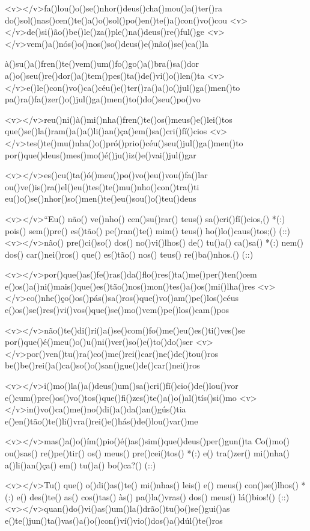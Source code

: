 <v></v>fa()lou()o()se()nhor()deus()cha()mou()a()ter()ra
do()sol()nas()cen()te()a()o()sol()po()en()te()a()con()vo()cou
<v></v>de()si()ão()be()le()za()ple()na()deus()re()ful()ge
<v></v>vem()a()nós()o()nos()so()deus()e()não()se()ca()la

à()su()a()fren()te()vem()um()fo()go()a()bra()sa()dor
a()o()seu()re()dor()a()tem()pes()ta()de()vi()o()len()ta
<v></v>e()le()con()vo()ca()céu()e()ter()ra()a()o()jul()ga()men()to
pa()ra()fa()zer()o()jul()ga()men()to()do()seu()po()vo

<v></v>reu()ni()à()mi()nha()fren()te()os()meus()e()lei()tos
que()se()la()ram()a()a()li()an()ça()em()sa()cri()fí()cios
<v></v>tes()te()mu()nha()o()pró()prio()céu()seu()jul()ga()men()to
por()que()deus()mes()mo()é()ju()iz()e()vai()jul()gar

<v></v>es()cu()ta()ó()meu()po()vo()eu()vou()fa()lar
ou()ve()is()ra()el()eu()tes()te()mu()nho()con()tra()ti
eu()o()se()nhor()so()men()te()eu()sou()o()teu()deus

<v></v>``Eu() não() ve()nho() cen()su()rar() teus() sa()cri()fí()cios,() *(:)
pois() sem()pre() es()tão() pe()ran()te() mim() teus() ho()lo()caus()tos;() (::)
<v></v>não() pre()ci()so() dos() no()vi()lhos() de() tu()a() ca()sa() *(:)
nem() dos() car()nei()ros() que() es()tão() nos() teus() re()ba()nhos.() (::)

<v></v>por()que()as()fe()ras()da()flo()res()ta()me()per()ten()cem
e()os()a()ni()mais()que()es()tão()nos()mon()tes()a()os()mi()lha()res
<v></v>co()nhe()ço()os()pás()sa()ros()que()vo()am()pe()los()céus
e()os()se()res()vi()vos()que()se()mo()vem()pe()los()cam()pos

<v></v>não()te()di()ri()a()se()com()fo()me()eu()es()ti()ves()se
por()que()é()meu()o()u()ni()ver()so()e()to()do()ser
<v></v>por()ven()tu()ra()co()me()rei()car()ne()de()tou()ros
be()be()rei()a()ca()so()o()san()gue()de()car()nei()ros

<v></v>i()mo()la()a()deus()um()sa()cri()fí()cio()de()lou()vor
e()cum()pre()os()vo()tos()que()fi()zes()te()a()o()al()tís()si()mo
<v></v>in()vo()ca()me()no()di()a()da()an()gús()tia
e()en()tão()te()li()vra()rei()e()hás()de()lou()var()me

<v></v>mas()a()o()ím()pio()é()as()sim()que()deus()per()gun()ta
Co()mo() ou()sas() re()pe()tir() os() meus() pre()cei()tos() *(:)
e() tra()zer() mi()nha() a()li()an()ça() em() tu()a() bo()ca?() (::)

<v></v>Tu() que() o()di()as()te() mi()nhas() leis() e() meus() con()se()lhos() *(:)
e() des()te() as() cos()tas() às() pa()la()vras() dos() meus() lá()bios!() (::)
<v></v>quan()do()vi()as()um()la()drão()tu()o()se()gui()as
e()te()jun()ta()vas()a()o()con()ví()vio()dos()a()dúl()te()ros

